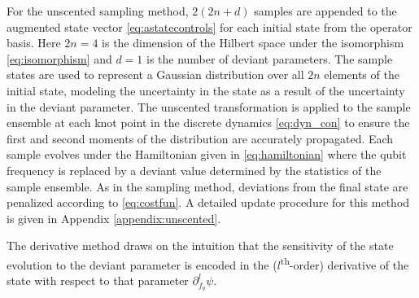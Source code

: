 For the unscented sampling method, $2(2n + d)$ samples
are appended to the augmented state vector \eqref{eq:astatecontrols}
for each initial state from the operator basis. Here $2n = 4$ is the
dimension of the Hilbert space under the isomorphism \eqref{eq:isomorphism}
and $d = 1$ is the number of deviant parameters. The sample
states are used to represent a Gaussian distribution over all $2n$
elements of the initial state, modeling
the uncertainty in the state as a result of the uncertainty in
the deviant parameter. The unscented transformation
is applied to the sample ensemble at each knot point in the discrete dynamics
\eqref{eq:dyn_con} to ensure the first and second moments of the distribution
are accurately propagated. Each sample evolves under the Hamiltonian given in
\eqref{eq:hamiltonian}
where the qubit frequency is replaced by a deviant value determined by the
statistics of the sample ensemble. As in the sampling method,
deviations from the final state are penalized according to \eqref{eq:costfun}.
A detailed update procedure for this method is given
in Appendix \ref{appendix:unscented}.

The derivative method draws on the intuition that
the sensitivity of the state evolution to the deviant parameter
is encoded in the ($l$\textsuperscript{th}-order)
derivative of the state with respect to that parameter
$\partial_{f_{q}}^{l} \psi$.


